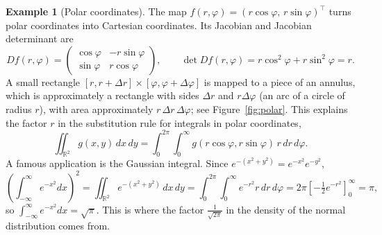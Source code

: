 \documentclass[11pt]{article}
\theoremstyle{definition}
\newtheorem{example}[definition]{Example}
\theoremstyle{plain}
\theoremstyle{remark}
\begin{document}
\begin{example}[Polar coordinates]\label{ex:polar}
    The map $f(r, \varphi) = (r\cos\varphi, \, r\sin\varphi)^\top$ turns polar coordinates into Cartesian coordinates. Its Jacobian and Jacobian determinant are
    \[Df(r, \varphi) = \begin{pmatrix} \cos\varphi & -r\sin\varphi \\ \sin\varphi & r\cos\varphi \end{pmatrix}, \qquad \det Df(r, \varphi) = r\cos^2\varphi + r\sin^2\varphi = r.\]
    A small rectangle $[r, r + \Delta r] \times [\varphi, \varphi + \Delta\varphi]$ is mapped to a piece of an annulus, which is approximately a rectangle with sides $\Delta r$ and $r\Delta\varphi$ (an arc of a circle of radius $r$), with area approximately $r \, \Delta r \, \Delta\varphi$; see Figure~\ref{fig:polar}. This explains the factor $r$ in the substitution rule for integrals in polar coordinates,
    \[\iint_{\mathbb{R}^2} g(x, y) \, dx \, dy = \int_0^{2\pi} \int_0^\infty g(r\cos\varphi, r\sin\varphi) \, r \, dr \, d\varphi.\]
    A famous application is the Gaussian integral. Since $e^{-(x^2 + y^2)} = e^{-x^2} e^{-y^2}$,
    \[\left(\int_{-\infty}^\infty e^{-x^2} dx\right)^2 = \iint_{\mathbb{R}^2} e^{-(x^2 + y^2)} \, dx \, dy = \int_0^{2\pi} \int_0^\infty e^{-r^2} r \, dr \, d\varphi = 2\pi \left[-\tfrac{1}{2} e^{-r^2}\right]_0^\infty = \pi,\]
    so $\int_{-\infty}^\infty e^{-x^2} dx = \sqrt{\pi}$. This is where the factor $\frac{1}{\sqrt{2\pi}}$ in the density of the normal distribution comes from.
\end{example}
\end{document}

